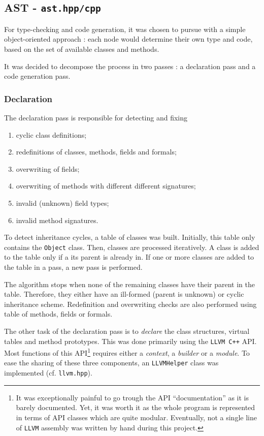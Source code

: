 \documentclass[a4paper, 12pt]{article}
\begin{document}
	\subsection{AST - \texttt{ast.hpp/cpp}}
	
	For type-checking and code generation, it was chosen to pursue with a simple object-oriented approach : each node would determine their own type and code, based on the set of available classes and methods.
	
	It was decided to decompose the process in two passes : a declaration pass and a code generation pass.
	
	\subsubsection{Declaration}
	
	The declaration pass is responsible for detecting and fixing
	
	\begin{enumerate}[noitemsep]
	    \item cyclic class definitions;
	    \item redefinitions of classes, methods, fields and formals;
	    \item overwriting of fields;
	    \item overwriting of methods with different different signatures;
	    \item invalid (unknown) field types;
	    \item invalid method signatures.
	\end{enumerate}
	
	To detect inheritance cycles, a table of classes was built. Initially, this table only contains the \texttt{Object} class. Then, classes are processed iteratively. A class is added to the table only if a its parent is already in. If one or more classes are added to the table in a pass, a new pass is performed.
	
	The algorithm stops when none of the remaining classes have their parent in the table. Therefore, they either have an ill-formed (parent is unknown) or cyclic inheritance scheme. Redefinition and overwriting checks are also performed using table of methods, fields or formals.
	
	The other task of the declaration pass is to \emph{declare} the class structures, virtual tables and method prototypes. This was done primarily using the \texttt{LLVM C++} API. Most functions of this API\footnote{It was exceptionally painful to go trough the API \enquote{documentation} as it is barely documented. Yet, it was worth it as the whole program is represented in terms of API classes which are quite modular. Eventually, not a single line of \texttt{LLVM} assembly was written by hand during this project.} requires either a \emph{context}, a \emph{builder} or a \emph{module}. To ease the sharing of these three components, an \texttt{LLVMHelper} class was implemented (cf. \texttt{llvm.hpp}).
	
\end{document}
